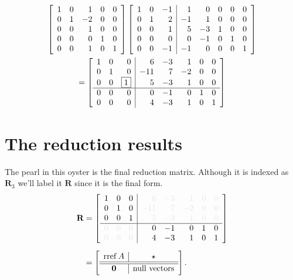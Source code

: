 \begin{multline}
\mat{ rrrrr }{
 1 & 0 &  1 & 0 & 0 \\
 0 & 1 & -2 & 0 & 0 \\
 0 & 0 &  1 & 0 & 0 \\ 
 0 & 0 &  0 & 1 & 0 \\
 0 & 0 &  1 & 0 & 1
} 
\left[
\begin{array}{ rrr|rrrrr }
 1 & 0 & -1 &  1 &  0 & 0 & 0 & 0 \\
 0 & 1 &  2 & -1 &  1 & 0 & 0 & 0 \\
 0 & 0 &  1 &  5 & -3 & 1 & 0 & 0 \\
 0 & 0 &  0 &  0 & -1 & 0 & 1 & 0 \\
 0 & 0 & -1 & -1 &  0 & 0 & 0 & 1
\end{array}
\right]\\
=
\mat{rrr|rrrrr}{
 1 & 0 & 0 &   6 & -3 &  1 & 0 & 0 \\
 0 & 1 & 0 & -11 &  7 & -2 & 0 & 0 \\
 0 & 0 & \pivot &   5 & -3 &  1 & 0 & 0 \\ \hline
 0 & 0 & 0 &   0 & -1 &  0 & 1 & 0 \\
 0 & 0 & 0 &   4 & -3 &  1 & 0 & 1
}    
\end{multline}

\section{The reduction results}
The pearl in this oyster is the final reduction matrix. Although it is indexed as $\textbf{R}_3$ we'll label it $\textbf{R}$ since it is the final form.
\begin{equation}
\begin{split}
\textbf{R} & = 
\mat{rrr|rrrrr}{
 1 & 0 & 0 &   \textcolor{ltgray}{6}   & \textcolor{ltgray}{-3} &  \textcolor{ltgray}{1} & \textcolor{ltgray}{0} & \textcolor{ltgray}{0} \\
 0 & 1 & 0 &   \textcolor{ltgray}{-11} & \textcolor{ltgray}{7}  & \textcolor{ltgray}{-2} & \textcolor{ltgray}{0} & \textcolor{ltgray}{0} \\
 0 & 0 & 1 &   \textcolor{ltgray}{5}   & \textcolor{ltgray}{-3} &  \textcolor{ltgray}{1} & \textcolor{ltgray}{0} & \textcolor{ltgray}{0} \\ \hline
 \textcolor{ltgray}{0} & \textcolor{ltgray}{0} & \textcolor{ltgray}{0} &   0 & -1 &  0 & 1 & 0 \\
 \textcolor{ltgray}{0} & \textcolor{ltgray}{0} & \textcolor{ltgray}{0} &   4 & -3 &  1 & 0 & 1
} \\[5pt] 
 & =
\mat{ c|c }{
\rref A{} & \star \\ \hline \hline
\textbf{0} & \text{null vectors}
}.
\end{split}
\end{equation}

